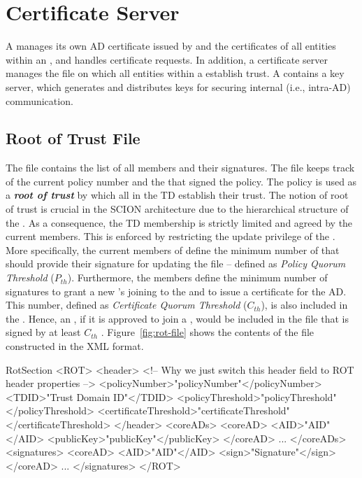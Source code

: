 \section{Certificate Server}
A \CS manages its own AD certificate issued by \TDC and the certificates of all entities within an \AD, and handles certificate requests. In addition, a \TDC certificate server manages the \RT file on which all entities within a \TD establish {trust}. A \CS contains a key server, which generates and distributes keys for securing internal (i.e., intra-AD) communication.

\subsection{Root of Trust File} \label{subsec:root-of-trust}
The \RT file contains the list of all \TDC members and their signatures. The file keeps track of the current policy number and the \ADs that signed the policy. The policy is used as a {\bf \em root of trust} by which all \ADs in the TD establish their trust. The notion of root of trust is crucial in the SCION architecture due to the hierarchical structure of the \TD. As a consequence, the TD membership is strictly limited and agreed by the current members. This is enforced by restricting the update privilege of the \PF. More specifically, the current members of \TDC define the minimum number of \ADs that should provide their signature for updating the \RT file -- defined as {\em Policy Quorum Threshold} ($P_{th}$). Furthermore, the \TDC members define the minimum number of \AD signatures to grant a new \AD's joining to the \TDC and to issue a certificate for the AD. This number, defined as {\em Certificate Quorum Threshold} ($C_{th}$), is also included in the \PF. Hence, an \AD, if it is approved to join a \TDC, would be included in the \RT file that is signed by at least $C_{th}$ \TDC \ADs. Figure~\ref{fig:rot-file} shows the contents of the \RT file constructed in the XML format. 

\begin{SaveVerbatim}{RotSection}
<ROT>
	<header> 
	<!-- Why we just switch this header field to ROT header properties -->
		<policyNumber>"policyNumber"</policyNumber>
		<TDID>"Trust Domain ID"</TDID>
		<policyThreshold>"policyThreshold"</policyThreshold>
		<certificateThreshold>"certificateThreshold"</certificateThreshold>
	</header>
	<coreADs>
		<coreAD>
			<AID>"AID"</AID>
			<publicKey>"publicKey"</publicKey>
		</coreAD>
		...
	</coreADs>
	<signatures>
		<coreAD>
			<AID>"AID"</AID>
			<sign>"Signature"</sign>
		</coreAD>
		...
	</signatures>
</ROT>
\end{SaveVerbatim}

